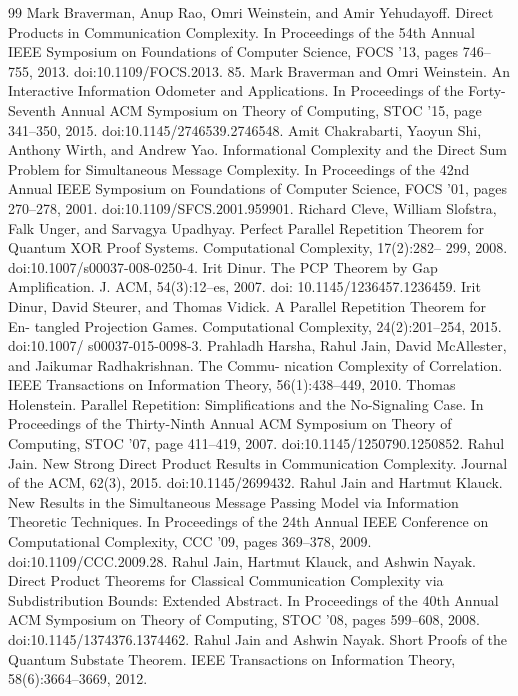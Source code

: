 \documentclass[10pt,a4paper]{article}
\begin{document}
\begin{thebibliography}{99}
 Mark Braverman, Anup Rao, Omri Weinstein, and Amir Yehudayoff. Direct Products in Communication Complexity. In Proceedings of the 54th Annual IEEE Symposium on Foundations of Computer Science, FOCS ’13, pages 746–755, 2013. doi:10.1109/FOCS.2013. 85.
 Mark Braverman and Omri Weinstein. An Interactive Information Odometer and Applications. In Proceedings of the Forty-Seventh Annual ACM Symposium on Theory of Computing, STOC ’15, page 341–350, 2015. doi:10.1145/2746539.2746548.
 Amit Chakrabarti, Yaoyun Shi, Anthony Wirth, and Andrew Yao. Informational Complexity and the Direct Sum Problem for Simultaneous Message Complexity. In Proceedings of the 42nd Annual IEEE Symposium on Foundations of Computer Science, FOCS ’01, pages 270–278, 2001. doi:10.1109/SFCS.2001.959901.
 Richard Cleve, William Slofstra, Falk Unger, and Sarvagya Upadhyay. Perfect Parallel Repetition Theorem for Quantum XOR Proof Systems. Computational Complexity, 17(2):282– 299, 2008. doi:10.1007/s00037-008-0250-4.
 Irit Dinur. The PCP Theorem by Gap Amplification. J. ACM, 54(3):12–es, 2007. doi: 10.1145/1236457.1236459.
 Irit Dinur, David Steurer, and Thomas Vidick. A Parallel Repetition Theorem for En- tangled Projection Games. Computational Complexity, 24(2):201–254, 2015. doi:10.1007/ s00037-015-0098-3.
 Prahladh Harsha, Rahul Jain, David McAllester, and Jaikumar Radhakrishnan. The Commu- nication Complexity of Correlation. IEEE Transactions on Information Theory, 56(1):438–449, 2010.
 Thomas Holenstein. Parallel Repetition: Simplifications and the No-Signaling Case. In Proceedings of the Thirty-Ninth Annual ACM Symposium on Theory of Computing, STOC ’07, page 411–419, 2007. doi:10.1145/1250790.1250852.
 Rahul Jain. New Strong Direct Product Results in Communication Complexity. Journal of the ACM, 62(3), 2015. doi:10.1145/2699432.
 Rahul Jain and Hartmut Klauck. New Results in the Simultaneous Message Passing Model via Information Theoretic Techniques. In Proceedings of the 24th Annual IEEE Conference on Computational Complexity, CCC ’09, pages 369–378, 2009. doi:10.1109/CCC.2009.28.
 Rahul Jain, Hartmut Klauck, and Ashwin Nayak. Direct Product Theorems for Classical Communication Complexity via Subdistribution Bounds: Extended Abstract. In Proceedings of the 40th Annual ACM Symposium on Theory of Computing, STOC ’08, pages 599–608, 2008. doi:10.1145/1374376.1374462.
 Rahul Jain and Ashwin Nayak. Short Proofs of the Quantum Substate Theorem. IEEE Transactions on Information Theory, 58(6):3664–3669, 2012.

\end{thebibliography}
\end{document}

